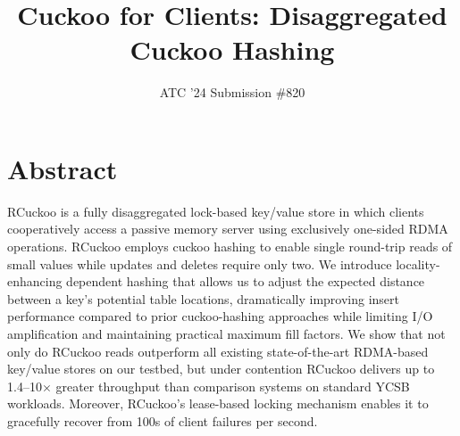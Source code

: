\documentclass[10pt,twocolumn]{article}
\begin{document}
\title{Cuckoo for Clients: Disaggregated Cuckoo Hashing}
\author{ATC '24 Submission \#820}
\date{}

\maketitle

\section*{Abstract}


RCuckoo is a fully disaggregated lock-based key/value store in which
clients cooperatively access a passive memory server using exclusively
one-sided RDMA operations.  RCuckoo employs cuckoo hashing to enable
single round-trip reads of small values while updates and deletes
require only two.  We introduce locality-enhancing dependent hashing
that allows us to adjust the expected distance between a key's
potential table locations, dramatically improving insert performance
compared to prior cuckoo-hashing approaches while limiting I/O
amplification and maintaining practical maximum fill factors.  We show
that not only do RCuckoo reads outperform all existing
state-of-the-art RDMA-based key/value stores on our testbed, but under
contention RCuckoo delivers up to 1.4--10$\times$ greater throughput
than comparison systems on standard YCSB workloads.  Moreover,
RCuckoo's lease-based locking mechanism enables it to gracefully
recover from 100s of client failures per second.

\end{document}
